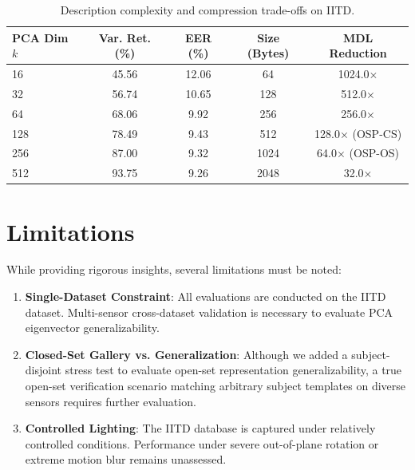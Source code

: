 \documentclass[conference]{IEEEtran}
\begin{document}
\begin{table}[h]
\centering
\caption{Description complexity and compression trade-offs on IITD.}
\label{tab:compression}
\begin{tabular}{@{}lcccc@{}}
\toprule
\textbf{PCA Dim $k$} & \textbf{Var. Ret. (\%)} & \textbf{EER (\%)} & \textbf{Size (Bytes)} & \textbf{MDL Reduction} \\
\midrule
16  & 45.56 & 12.06 & 64 & 1024.0$\times$ \\
32  & 56.74 & 10.65 & 128 & 512.0$\times$ \\
64  & 68.06 & 9.92 & 256 & 256.0$\times$ \\
128 & 78.49 & 9.43 & 512 & 128.0$\times$ (OSP-CS) \\
256 & 87.00 & 9.32 & 1024 & 64.0$\times$ (OSP-OS) \\
512 & 93.75 & 9.26 & 2048 & 32.0$\times$ \\
\bottomrule
\end{tabular}
\end{table}

\section{Limitations}
\label{sec:limitations}

While providing rigorous insights, several limitations must be noted:
\begin{enumerate}
    \item \textbf{Single-Dataset Constraint}: All evaluations are conducted on the IITD dataset. Multi-sensor cross-dataset validation is necessary to evaluate PCA eigenvector generalizability.
    \item \textbf{Closed-Set Gallery vs. Generalization}: Although we added a subject-disjoint stress test to evaluate open-set representation generalizability, a true open-set verification scenario matching arbitrary subject templates on diverse sensors requires further evaluation.
    \item \textbf{Controlled Lighting}: The IITD database is captured under relatively controlled conditions. Performance under severe out-of-plane rotation or extreme motion blur remains unassessed.
\end{enumerate}

\end{document}
